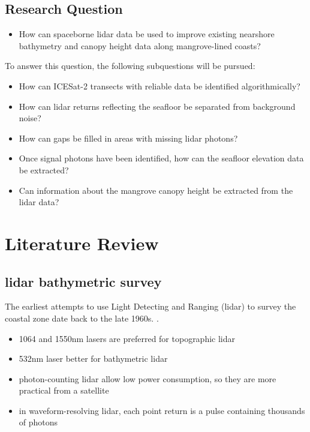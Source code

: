 \hypertarget{research-question}{%
  \section{Research Question}\label{research-question}}

\begin{itemize}
  \item
        How can spaceborne lidar data be used to improve existing nearshore
        bathymetry and canopy height data along mangrove-lined coasts?
\end{itemize}

To answer this question, the following subquestions will be pursued:

\begin{itemize}
  \item
        How can ICESat-2 transects with reliable data be identified
        algorithmically?
  \item
        How can lidar returns reflecting the seafloor be separated from
        background noise?
  \item
        How can gaps be filled in areas with missing lidar photons?
  \item
        Once signal photons have been identified, how can the seafloor
        elevation data be extracted?
  \item
        Can information about the mangrove canopy height be extracted from the
        lidar data?
\end{itemize}

\hypertarget{literature-review}{%
  \chapter{Literature Review}\label{literature-review}}

\hypertarget{lidar-bathymetric-survey}{%
  \section{lidar bathymetric survey}\label{lidar-bathymetric-survey}}

The earliest attempts to use Light Detecting and Ranging (lidar) to survey the coastal zone date back to the late 1960s. \cite{Bailly2016}.

\begin{itemize}
  \item
        1064 and 1550nm lasers are preferred for topographic lidar
  \item
        532nm laser better for bathymetric lidar
  \item
        photon-counting lidar allow low power consumption, so they are more
        practical from a satellite
  \item
        in waveform-resolving lidar, each point return is a pulse containing
        thousands of photons
\end{itemize}

